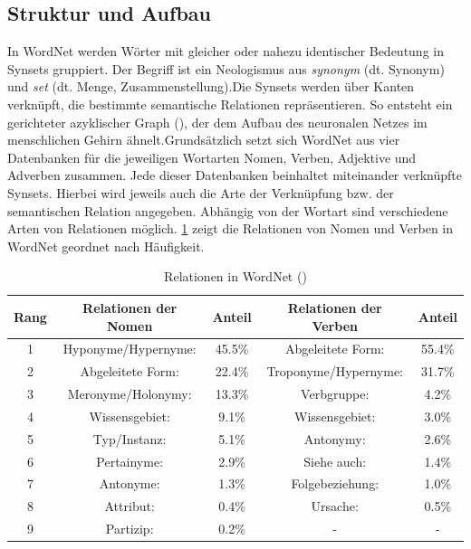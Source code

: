 \subsection{Struktur und Aufbau}

In WordNet werden Wörter mit gleicher oder nahezu identischer Bedeutung in Synsets gruppiert. Der Begriff ist ein Neologismus aus \textit{synonym} (dt. Synonym) und \textit{set} (dt. Menge, Zusammenstellung).Die Synsets werden über Kanten verknüpft, die bestimmte semantische Relationen repräsentieren. So entsteht ein gerichteter azyklischer Graph (\cite[vgl.][12]{OLTRAMANI}), der dem Aufbau des neuronalen Netzes im menschlichen Gehirn ähnelt.Grundsätzlich setzt sich WordNet aus vier Datenbanken für die jeweiligen Wortarten Nomen, Verben, Adjektive und Adverben zusammen. Jede dieser Datenbanken beinhaltet miteinander verknüpfte Synsets. Hierbei wird jeweils auch die Arte der Verknüpfung bzw. der semantischen Relation angegeben. Abhängig von der Wortart sind verschiedene Arten von Relationen möglich. \ref{table:table2} zeigt die Relationen von Nomen und Verben in WordNet geordnet nach Häufigkeit.
\par
\begin{table}[h!]
  \centering
  \begin{tabular}{ccccc} %
    \toprule
     Rang & Relationen der Nomen & Anteil  & Relationen der Verben & Anteil \\
    \midrule
    1 & Hyponyme/Hypernyme: & 45.5\% & Abgeleitete Form:    & 55.4\% \\
    2 & Abgeleitete Form:   & 22.4\% & Troponyme/Hypernyme: & 31.7\% \\
    3 & Meronyme/Holonymy:  & 13.3\% & Verbgruppe:          & 4.2\%  \\
    4 & Wissensgebiet:      & 9.1\%  & Wissensgebiet:       & 3.0\%  \\
    5 & Typ/Instanz: 		& 5.1\%  & Antonymy:			& 2.6\%  \\
    6 & Pertainyme: 		& 2.9\%  & Siehe auch: 		    & 1.4\%  \\
    7 & Antonyme: 			& 1.3\% & Folgebeziehung: 	    & 1.0\%  \\
	8 & Attribut: 			& 0.4\%  & Ursache: 			& 0.5\%  \\
	9 & Partizip: 	        & 0.2\%  & -     	            & -  	 \\
	\bottomrule
  \end{tabular}
  \caption{Relationen in WordNet (\cite[vgl.][9]{MAZIARZ})}
  \label{table:table2}
\end{table}
\par


